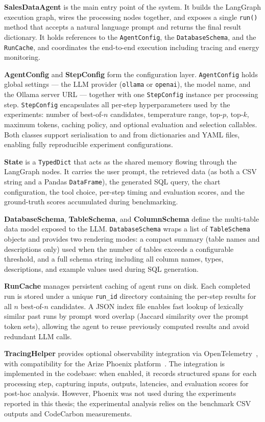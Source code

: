 \textbf{SalesDataAgent} is the main entry point of the system. It builds the LangGraph
execution graph, wires the processing nodes together, and exposes a single \texttt{run()}
method that accepts a natural language prompt and returns the final result dictionary.
It holds references to the \texttt{AgentConfig}, the \texttt{DatabaseSchema}, and the
\texttt{RunCache}, and coordinates the end-to-end execution including tracing and
energy monitoring.

\textbf{AgentConfig} and \textbf{StepConfig} form the configuration layer.
\texttt{AgentConfig} holds global settings — the LLM provider (\texttt{ollama} or
\texttt{openai}), the model name, and the Ollama server URL — together with one
\texttt{StepConfig} instance per processing step. \texttt{StepConfig} encapsulates
all per-step hyperparameters used by the experiments: number of best-of-$n$
candidates, temperature range, top-$p$, top-$k$, maximum tokens, caching policy, and optional evaluation
and selection callables. Both classes support serialisation to and from dictionaries
and YAML files, enabling fully reproducible experiment configurations.

\textbf{State} is a \texttt{TypedDict} that acts as the shared memory flowing through
the LangGraph nodes. It carries the user prompt, the retrieved data (as both a CSV
string and a Pandas \texttt{DataFrame}), the generated SQL query, the chart
configuration, the tool choice, per-step timing and evaluation scores, and the
ground-truth scores accumulated during benchmarking.

\textbf{DatabaseSchema}, \textbf{TableSchema}, and \textbf{ColumnSchema} define the
multi-table data model exposed to the LLM. \texttt{DatabaseSchema} wraps a list of
\texttt{TableSchema} objects and provides two rendering modes: a compact summary
(table names and descriptions only) used when the number of tables exceeds a
configurable threshold, and a full schema string including all column names, types,
descriptions, and example values used during SQL generation.

\textbf{RunCache} manages persistent caching of agent runs on disk. Each completed
run is stored under a unique \texttt{run\_id} directory containing the per-step
results for all $n$ best-of-$n$ candidates. A JSON index file enables fast lookup
of lexically similar past runs by prompt word overlap (Jaccard similarity over the
prompt token sets), allowing the agent to reuse previously computed results and
avoid redundant LLM calls.

\textbf{TracingHelper} provides optional observability integration via
OpenTelemetry~\cite{opentelemetry}, with compatibility for the Arize Phoenix
platform~\cite{arize_phoenix}. The integration is implemented in the codebase:
when enabled, it records structured spans for each processing step, capturing
inputs, outputs, latencies, and evaluation scores for post-hoc analysis.
However, Phoenix was not used during the experiments reported in this thesis;
the experimental analysis relies on the benchmark CSV outputs and CodeCarbon
measurements.

